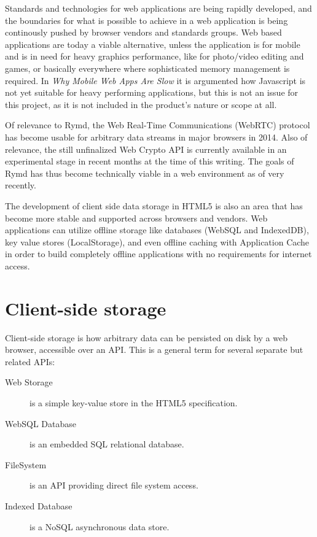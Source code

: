 Standards and technologies for web applications are being rapidly developed, and the boundaries for what is possible to achieve in a web application is being continously pushed by browser vendors and standards groups. Web based applications are today a viable alternative, unless the application is for mobile and is in need for heavy graphics performance, like for photo/video editing and games, or basically everywhere where sophisticated memory management is required. In \emph{Why Mobile Web Apps Are Slow} \cite{MobileApps:Online} it is argumented how Javascript is not yet suitable for heavy performing applications, but this is not an issue for this project, as it is not included in the product's nature or scope at all.

Of relevance to Rymd, the Web Real-Time Communications (WebRTC) protocol \cite{WebRTC:Online} has become usable for arbitrary data streams in major browsers in 2014. Also of relevance, the still unfinalized Web Crypto API \cite{WebCrypto:Online} is currently available in an experimental stage in recent months at the time of this writing. The goals of Rymd has thus become technically viable in a web environment as of very recently.

The development of client side data storage in HTML5 is also an area that has become more stable and supported across browsers and vendors. Web applications can utilize offline storage like databases (WebSQL and IndexedDB), key value stores (LocalStorage), and even offline caching with Application Cache \cite{OfflineWebApps:Online} in order to build completely offline applications with no requirements for internet access.


\section{Client-side storage}

Client-side storage is how arbitrary data can be persisted on disk by a web browser, accessible over an API. This is a general term for several separate but related APIs:

\begin{description}
  \item[Web Storage]\cite{WebStorage:Online} is a simple key-value store in the HTML5 specification.
  \item[WebSQL Database]\cite{WebSQL:Online} is an embedded SQL relational database.
  \item[FileSystem]\cite{FileSystem:Online} is an API providing direct file system access.
  \item[Indexed Database]\cite{IndexedDB:Online} is a NoSQL asynchronous data store.
\end{description}

